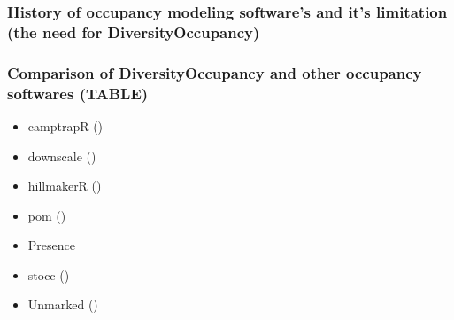 \documentclass[article]{jss}
\providecommand{\tightlist}{%
  \setlength{\itemsep}{0pt}\setlength{\parskip}{0pt}}
\begin{document}
\subsubsection{History of occupancy modeling software's and it's
limitation (the need for
DiversityOccupancy)}\label{history-of-occupancy-modeling-softwares-and-its-limitation-the-need-for-diversityoccupancy}

\subsubsection{Comparison of DiversityOccupancy and other occupancy
softwares
(TABLE)}\label{comparison-of-diversityoccupancy-and-other-occupancy-softwares-table}

\begin{itemize}
\tightlist
\item
  camptrapR ()
\item
  downscale ()
\item
  hillmakerR ()
\item
  pom ()
\item
  Presence
\item
  stocc ()
\item
  Unmarked ()
\end{itemize}

\begin{table}[ht]
\centering
{}
\end{table}
\end{document}
